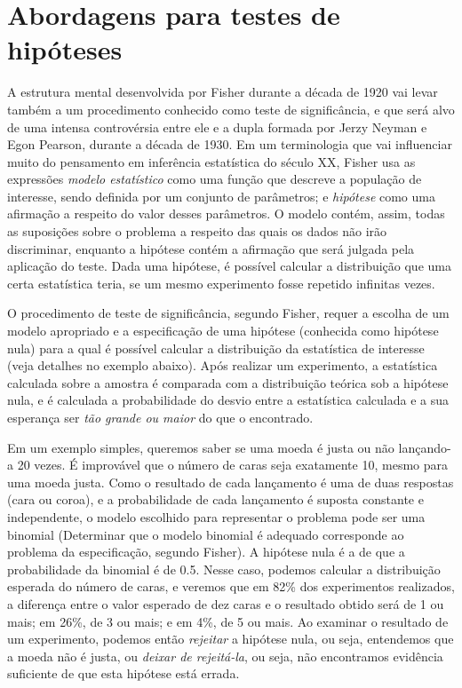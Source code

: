 \section{Abordagens para testes de hipóteses}
A estrutura mental desenvolvida por Fisher durante a década de 1920 vai levar também a um procedimento conhecido como teste de 
significância, e que será alvo de uma intensa controvérsia entre ele e a dupla formada por Jerzy Neyman e Egon Pearson, 
durante a década de 1930. Em um terminologia que vai influenciar muito do pensamento em inferência estatística do século XX,
Fisher usa as expressões {\em modelo estatístico} como uma função que descreve a população de interesse, sendo definida 
por um conjunto de parâmetros; e {\em hipótese} como uma afirmação a respeito do valor desses parâmetros. O modelo contém, 
assim, todas as suposições sobre o problema a respeito das quais os dados não irão discriminar, enquanto a hipótese
contém a afirmação que será julgada pela aplicação do teste. Dada uma hipótese, é possível
calcular a distribuição que uma certa estatística teria, se um mesmo experimento fosse repetido infinitas vezes.

O procedimento de teste de significância, segundo Fisher, requer a escolha de um modelo apropriado e a especificação de uma 
hipótese (conhecida como hipótese nula) para a qual é possível
calcular a distribuição da estatística de interesse (veja detalhes no exemplo abaixo).
Após realizar um experimento, a estatística calculada sobre a amostra é comparada com a distribuição teórica sob a hipótese nula,
e é calculada a probabilidade do desvio entre a estatística calculada e a sua esperança ser {\em tão grande ou maior} do que o
encontrado. 

Em um exemplo simples, queremos saber se uma moeda é justa ou não lançando-a 20 vezes. É improvável que o número de caras seja
exatamente 10, mesmo para uma moeda justa. Como o resultado de cada lançamento é uma de duas respostas (cara ou coroa), 
e a probabilidade de cada lançamento é suposta constante e independente, o modelo escolhido para representar o problema
pode ser uma binomial (Determinar que o modelo binomial é adequado corresponde ao problema da especificação,
segundo Fisher).
A hipótese nula é a de que a probabilidade da binomial é de 0.5. Nesse caso, podemos calcular a 
distribuição esperada do número de caras, e veremos que em 82\% dos experimentos realizados, a diferença entre o valor esperado
de dez caras e o resultado obtido será de 1 ou mais; em 26\%, de 3 ou mais; e em 4\%, de 5 ou mais. Ao examinar o resultado 
de um experimento, podemos então {\em rejeitar} a hipótese nula, ou seja, entendemos que a moeda não é justa, ou {\em deixar
de rejeitá-la}, ou seja, não encontramos evidência suficiente de que esta hipótese está errada.

